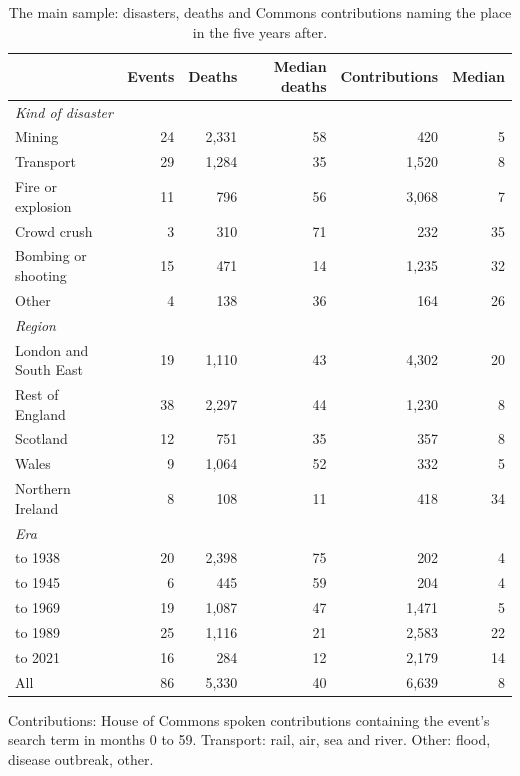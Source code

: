 \documentclass[11pt,a4paper]{article}
\begin{document}
\begin{table}[tbp]\centering\small\begin{threeparttable}\caption{The main sample: disasters, deaths and Commons contributions naming the place in the five years after.}\label{tab:sample}\begin{tabular}{lrrrrr}\toprule & Events & Deaths & Median deaths & Contributions & Median\\\midrule
\multicolumn{6}{l}{\textit{Kind of disaster}}\\
\quad Mining & 24 & 2,331 & 58 & 420 & 5\\
\quad Transport & 29 & 1,284 & 35 & 1,520 & 8\\
\quad Fire or explosion & 11 & 796 & 56 & 3,068 & 7\\
\quad Crowd crush & 3 & 310 & 71 & 232 & 35\\
\quad Bombing or shooting & 15 & 471 & 14 & 1,235 & 32\\
\quad Other & 4 & 138 & 36 & 164 & 26\\
\multicolumn{6}{l}{\textit{Region}}\\
\quad London and South East & 19 & 1,110 & 43 & 4,302 & 20\\
\quad Rest of England & 38 & 2,297 & 44 & 1,230 & 8\\
\quad Scotland & 12 & 751 & 35 & 357 & 8\\
\quad Wales & 9 & 1,064 & 52 & 332 & 5\\
\quad Northern Ireland & 8 & 108 & 11 & 418 & 34\\
\multicolumn{6}{l}{\textit{Era}}\\
\quad 1909 to 1938 & 20 & 2,398 & 75 & 202 & 4\\
\quad 1939 to 1945 & 6 & 445 & 59 & 204 & 4\\
\quad 1946 to 1969 & 19 & 1,087 & 47 & 1,471 & 5\\
\quad 1970 to 1989 & 25 & 1,116 & 21 & 2,583 & 22\\
\quad 1990 to 2021 & 16 & 284 & 12 & 2,179 & 14\\
\midrule All & 86 & 5,330 & 40 & 6,639 & 8\\
\bottomrule\end{tabular}\begin{tablenotes}\footnotesize\item Contributions: House of Commons spoken contributions containing the event's search term in months 0 to 59. Transport: rail, air, sea and river. Other: flood, disease outbreak, other.\end{tablenotes}\end{threeparttable}\end{table}
\end{document}

